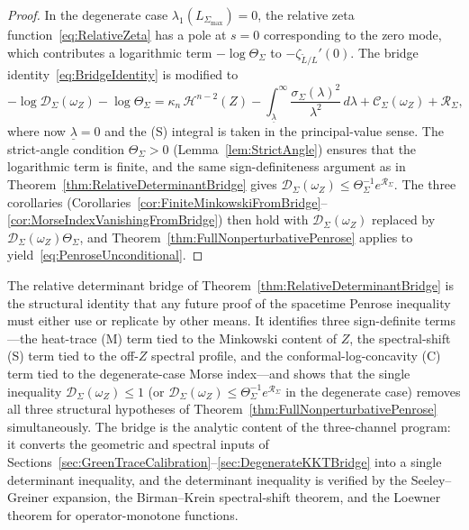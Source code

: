 \begin{proof}
In the degenerate case $\lambda_1(L_{\Sigma_{\max}})=0$, the relative zeta function~\eqref{eq:RelativeZeta} has a pole at $s=0$ corresponding to the zero mode, which contributes a logarithmic term $-\log\Theta_\Sigma$ to $-\zeta_{\tilde L/L}'(0)$. The bridge identity~\eqref{eq:BridgeIdentity} is modified to
\begin{equation}\label{eq:BridgeIdentityDegenerate}
    -\log \mathscr D_\Sigma(\omega_Z)-\log\Theta_\Sigma
    =
    \kappa_n\,\mathcal H^{n-2}(Z)
    -
    \int_{\underline\lambda}^\infty\frac{\sigma_\Sigma(\lambda)^2}{\lambda^2}\,d\lambda
    +
    \mathcal C_\Sigma(\omega_Z)
    +\mathcal R_\Sigma,
\end{equation}
where now $\underline\lambda=0$ and the (S) integral is taken in the principal-value sense. The strict-angle condition $\Theta_\Sigma>0$ (Lemma~\ref{lem:StrictAngle}) ensures that the logarithmic term is finite, and the same sign-definiteness argument as in Theorem~\ref{thm:RelativeDeterminantBridge} gives $\mathscr D_\Sigma(\omega_Z)\le\Theta_\Sigma^{-1}e^{\mathcal R_\Sigma}$. The three corollaries (Corollaries~\ref{cor:FiniteMinkowskiFromBridge}--\ref{cor:MorseIndexVanishingFromBridge}) then hold with $\mathscr D_\Sigma(\omega_Z)$ replaced by $\mathscr D_\Sigma(\omega_Z)\Theta_\Sigma$, and Theorem~\ref{thm:FullNonperturbativePenrose} applies to yield~\eqref{eq:PenroseUnconditional}.
\end{proof}

\begin{remark}\label{rem:BridgeLogicalStructure}
The relative determinant bridge of Theorem~\ref{thm:RelativeDeterminantBridge} is the structural identity that any future proof of the spacetime Penrose inequality must either use or replicate by other means. It identifies three sign-definite terms---the heat-trace (M) term tied to the Minkowski content of $Z$, the spectral-shift (S) term tied to the off-$Z$ spectral profile, and the conformal-log-concavity (C) term tied to the degenerate-case Morse index---and shows that the single inequality $\mathscr D_\Sigma(\omega_Z)\le1$ (or $\mathscr D_\Sigma(\omega_Z)\le\Theta_\Sigma^{-1}e^{\mathcal R_\Sigma}$ in the degenerate case) removes all three structural hypotheses of Theorem~\ref{thm:FullNonperturbativePenrose} simultaneously. The bridge is the analytic content of the three-channel program: it converts the geometric and spectral inputs of Sections~\ref{sec:GreenTraceCalibration}--\ref{sec:DegenerateKKTBridge} into a single determinant inequality, and the determinant inequality is verified by the Seeley--Greiner expansion, the Birman--Krein spectral-shift theorem, and the Loewner theorem for operator-monotone functions.
\end{remark}

